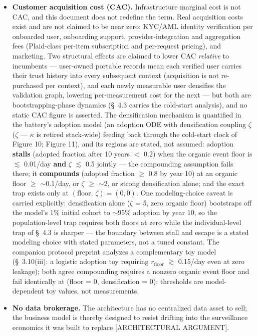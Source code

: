 \documentclass[11pt,twocolumn]{article}
\begin{document}
\begin{itemize}
\item \textbf{Customer acquisition cost (CAC).} Infrastructure marginal cost is not CAC, and this document does not redefine the term. Real acquisition costs exist and are not claimed to be near zero: KYC/AML identity verification per onboarded user, onboarding support, provider-integration and aggregation fees (Plaid-class per-item subscription and per-request pricing), and marketing. Two structural effects are claimed to lower CAC \emph{relative} to incumbents --- user-owned portable records mean each verified user carries their trust history into every subsequent context (acquisition is not re-purchased per context), and each newly measurable user densifies the validation graph, lowering per-measurement cost for the next --- but both are bootstrapping-phase dynamics (\S~4.3 carries the cold-start analysis), and no static CAC figure is asserted. The densification mechanism is quantified in the battery's adoption model (an adoption ODE with densification coupling $\zeta$ ($\zeta$ --- $\kappa$ is retired stack-wide) feeding back through the cold-start clock of Figure 10; Figure 11), and its regions are stated, not assumed: adoption \textbf{stalls} (adopted fraction after 10 years $<$ 0.2) when the organic event floor is $\lesssim$ 0.01/day \textbf{and} $\zeta$ $\lesssim$ 0.5 jointly --- the compounding assumption fails there; it \textbf{compounds} (adopted fraction $\geq$ 0.8 by year 10) at an organic floor $\geq$ $\sim$0.1/day, or $\zeta$ $\geq$ $\sim$2, or strong densification alone; and the exact trap exists only at $(\mathrm{floor},\, \zeta) = (0, 0)$. One modeling-choice caveat is carried explicitly: densification alone ($\zeta$ = 5, zero organic floor) bootstraps off the model's 1\% initial cohort to $\sim$95\% adoption by year 10, so the population-level trap requires both floors at zero while the individual-level trap of \S~4.3 is sharper --- the boundary between stall and escape is a stated modeling choice with stated parameters, not a tuned constant. The companion protocol preprint analyzes a complementary toy model (\S~3.10(iii): a logistic adoption toy requiring $r_{\mathrm{floor}}$ $\gtrsim$ 0.15/day even at zero leakage); both agree compounding requires a nonzero organic event floor and fail identically at (floor = 0, densification = 0); thresholds are model-dependent toy values, not measurements.
\item \textbf{No data brokerage.} The architecture has no centralized data asset to sell; the business model is thereby designed to resist drifting into the surveillance economics it was built to replace [ARCHITECTURAL ARGUMENT].
\end{itemize}
\end{document}
